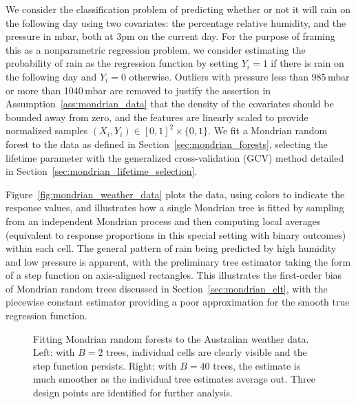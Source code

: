 \documentclass[11pt,lof]{puthesis}
\theoremstyle{break}
\theoremstyle{proof}
\begin{document}
We consider the classification problem of predicting whether or not it will
rain on the following day using two covariates: the percentage relative
humidity, and the pressure in mbar, both at 3pm on the current day. For the
purpose of framing this as a nonparametric regression problem, we consider
estimating the probability of rain as the regression function by setting
$Y_i = 1$ if there is rain on the following day and $Y_i = 0$ otherwise.
Outliers with pressure less than 985\,mbar or more than 1040\,mbar are removed
to justify the assertion in Assumption~\ref{ass:mondrian_data} that the density
of the covariates should be bounded away from zero, and the features are
linearly scaled to provide normalized samples
$(X_i, Y_i) \in [0, 1]^2 \times \{0, 1\}$.
We fit a Mondrian random forest to the data as defined in
Section~\ref{sec:mondrian_forests}, selecting the lifetime parameter with the
generalized cross-validation (GCV) method detailed in
Section~\ref{sec:mondrian_lifetime_selection}.

Figure~\ref{fig:mondrian_weather_data} plots the
data, using colors to indicate the response values, and illustrates how a
single Mondrian tree is fitted by sampling from an independent Mondrian process
and then computing local averages (equivalent to response proportions in this
special setting with binary outcomes) within each cell. The general pattern of
rain being predicted by high humidity and low pressure is apparent, with the
preliminary tree estimator taking the form of a step function on axis-aligned
rectangles. This illustrates the first-order bias of Mondrian random trees
discussed in Section~\ref{sec:mondrian_clt}, with the piecewise constant
estimator providing a poor approximation for the smooth true regression
function.

\begin{figure}[b!]
  \centering
  \begin{subfigure}{0.49\textwidth}
    \centering
  \end{subfigure}
  \begin{subfigure}{0.49\textwidth}
    \centering
  \end{subfigure}
  \caption[Fitting Mondrian random forests to the Australian weather data]{
    Fitting Mondrian random forests to the Australian weather data.
    Left: with $B=2$ trees, individual cells are clearly visible and the step
    function persists. Right: with $B=40$ trees, the estimate is much smoother
    as the individual tree estimates average out.
  Three design points are identified for further analysis.}
  \label{fig:mondrian_weather_forest}
\end{figure}
\end{document}
